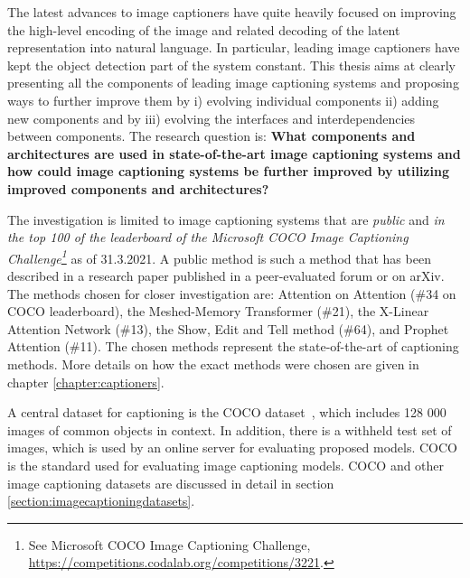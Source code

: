 \documentclass[english,twoside,openright]{HYgraduMLDS}
\begin{document}
The latest advances to image captioners have quite heavily focused on improving the high-level encoding of the image and related decoding of the latent representation into natural language. In particular, leading image captioners have kept the object detection part of the system constant. This thesis aims at clearly presenting all the components of leading image captioning systems and proposing ways to further improve them by i) evolving individual components ii) adding new components and by iii) evolving the interfaces and interdependencies between components. The research question is: \textbf{What components and architectures are used in state-of-the-art image captioning systems and how could image captioning systems be further improved by utilizing improved components and architectures?}

The investigation is limited to image captioning systems that are \textit{public} and \textit{in the top 100 of the leaderboard of the Microsoft COCO Image Captioning Challenge\footnote{See Microsoft COCO Image Captioning Challenge, \url{https://competitions.codalab.org/competitions/3221}.}} as of 31.3.2021. A public method is such a method that has been described in a research paper published in a peer-evaluated forum or on arXiv. The methods chosen for closer investigation are: Attention on Attention (\#34 on COCO leaderboard), the Meshed-Memory Transformer (\#21), the X-Linear Attention Network (\#13), the Show, Edit and Tell method (\#64), and Prophet Attention (\#11). The chosen methods represent the state-of-the-art of captioning methods. More details on how the exact methods were chosen are given in chapter \ref{chapter:captioners}.

A central dataset for captioning is the COCO dataset~\cite{Coco}, which includes 128 000 images of common objects in context. In addition, there is a withheld test set of images, which is used by an online server for evaluating proposed models. COCO is the standard used for evaluating image captioning models. COCO and other image captioning datasets are discussed in detail in section \ref{section:imagecaptioningdatasets}.
\end{document}
